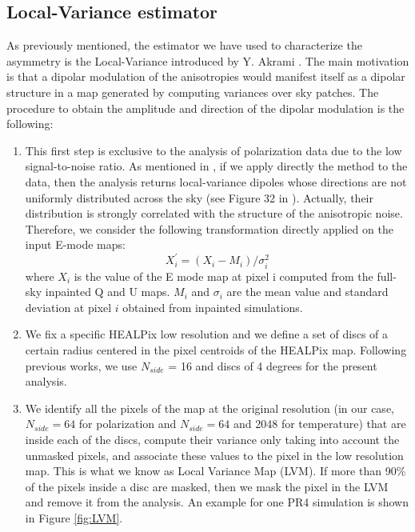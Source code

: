 \subsection{Local-Variance estimator}\label{subsection:3.3}

As previously mentioned, the estimator we have used to characterize the asymmetry is the Local-Variance introduced by Y. Akrami \cite{Akrami:2014eta}. The main motivation is that a dipolar modulation of the anisotropies would manifest itself as a dipolar structure in a map generated by computing variances over sky patches.
The procedure to obtain the amplitude and direction of the dipolar modulation is the following:
%
\begin{enumerate}
    \item This first step is exclusive to the analysis of polarization data due to the low signal-to-noise ratio. As mentioned in \cite{Planck:2019evm}, if we apply directly the method to the data, then the analysis returns local-variance dipoles whose directions are not uniformly distributed across the sky (see Figure 32 in \cite{Planck:2019evm}). Actually, their distribution is strongly correlated with the structure of the anisotropic noise. Therefore, we consider the following transformation directly applied on the input E-mode maps:
    \begin{equation}
        \label{eq:Bias}
        X^{'}_{i} = (X_{i}-M_{i})/\sigma_{i}^{2} 
    \end{equation}
    where $X_{i}$ is the value of the E mode map at pixel i computed from the full-sky inpainted Q and U maps. $M_{i}$ and $\sigma_{i}$ are the mean value and standard deviation at pixel $i$ obtained from inpainted simulations.

    \item We fix a specific HEALPix low resolution and we define a set of discs of a certain radius centered in the pixel centroids of the HEALPix map. Following previous works, we use $N_{side}$ = 16 and discs of 4 degrees for the present analysis. 
    
    \item We identify all the pixels of the map at the original resolution (in our case, $N_{side} = 64$ for polarization and $N_{side} = 64$ and 2048 for temperature)  that are inside each of the discs, compute their variance only taking into account the unmasked pixels, and associate these values to the pixel in the low resolution map. This is what we know as Local Variance Map (LVM). If more than 90\% of the pixels inside a disc are masked, then we mask the pixel in the LVM and remove it from the analysis. An example for one PR4 simulation is shown in Figure \ref{fig:LVM}.


\end{enumerate}
